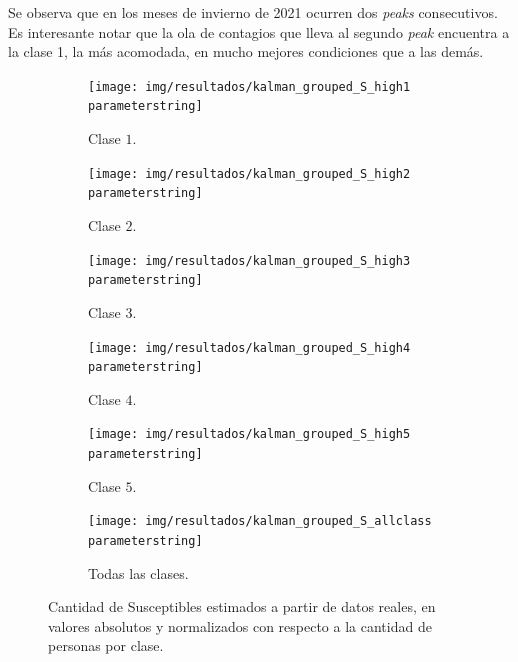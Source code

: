 Se observa que en los meses de invierno de 2021 ocurren dos \textit{peaks} consecutivos. Es interesante notar que la ola de contagios que lleva al segundo \textit{peak} encuentra a la clase 1, la más acomodada, en mucho mejores condiciones que a las demás.


\begin{figure}[H]
     \centering
     \begin{subfigure}[b]{0.47\textwidth}
         \centering
         \texttt{[image: img/resultados/kalman\_grouped\_S\_high1\\parameterstring]}
         \caption{Clase \(1\).}
     \end{subfigure}
     \hfill
     \begin{subfigure}[b]{.47\textwidth}
         \centering
         \texttt{[image: img/resultados/kalman\_grouped\_S\_high2\\parameterstring]}
         \caption{Clase \(2\).}
     \end{subfigure}
     \hfill
     \begin{subfigure}[b]{.47\textwidth}
         \centering
         \texttt{[image: img/resultados/kalman\_grouped\_S\_high3\\parameterstring]}
         \caption{Clase \(3\).}
     \end{subfigure}
     \hfill
     \begin{subfigure}[b]{.47\textwidth}
         \centering
         \texttt{[image: img/resultados/kalman\_grouped\_S\_high4\\parameterstring]}
         \caption{Clase \(4\).}
     \end{subfigure}
     \hfill
     \begin{subfigure}[b]{.47\textwidth}
         \centering
         \texttt{[image: img/resultados/kalman\_grouped\_S\_high5\\parameterstring]}
         \caption{Clase \(5\).}
     \end{subfigure}
     \hfill
     \begin{subfigure}[b]{.47\textwidth}
         \centering
         \texttt{[image: img/resultados/kalman\_grouped\_S\_allclass\\parameterstring]}
         \caption{Todas las clases.}
     \end{subfigure}
        \caption{Cantidad de Susceptibles estimados a partir de datos reales, en valores absolutos y normalizados con respecto a la cantidad de personas por clase.}
        \label{s-comp-high}
\end{figure}

